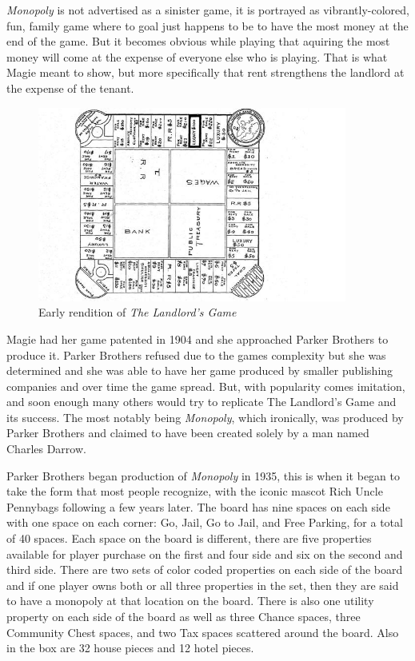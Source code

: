 \documentclass{article}
\begin{document}
\textit{Monopoly} is not advertised as a sinister game, it is portrayed as vibrantly-colored, fun, family game where to goal just happens to be to have the most money at the end of the game.  But it becomes obvious while playing that aquiring the most money will come at the expense of everyone else who is playing.  That is what Magie meant to show, but more specifically that rent strengthens the landlord at the expense of the tenant.


\begin{figure}
    \centering
    \includegraphics[width=4.0in]{landlordsgame}
    \caption{Early rendition of \textit{The Landlord's Game}}
    \label{landlordsgame_image}
\end{figure}


Magie had her game patented in 1904 and she approached Parker Brothers to produce it.  Parker Brothers refused due to the games complexity but she was determined and she was able to have her game produced by smaller publishing companies and over time the game spread. But, with popularity comes imitation, and soon enough many others would try to replicate The Landlord’s Game and its success.  The most notably being \textit{Monopoly}, which ironically, was produced by Parker Brothers and claimed to have been created solely by a man named Charles Darrow.

Parker Brothers began production of \textit{Monopoly} in 1935, this is when it began to take the form that most people recognize, with the iconic mascot Rich Uncle Pennybags following a few years later.  The board has nine spaces on each side with one space on each corner: Go, Jail, Go to Jail, and Free Parking, for a total of 40 spaces.  Each space on the board is different, there are five properties available for player purchase on the first and four side and six on the second and third side.  There are two sets of color coded properties on each side of the board and if one player owns both or all three properties in the set, then they are said to have a monopoly at that location on the board.  There is also one utility property on each side of the board as well as three Chance spaces, three Community Chest spaces, and two Tax spaces scattered around the board.  Also in the box are 32 house pieces and 12 hotel pieces.
\end{document}
